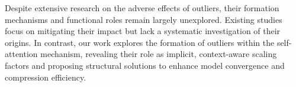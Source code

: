 Despite extensive research on the adverse effects of outliers, their formation mechanisms and functional roles remain largely unexplored. Existing studies focus on mitigating their impact but lack a systematic investigation of their origins. In contrast, our work explores the formation of outliers within the self-attention mechanism, revealing their role as implicit, context-aware scaling factors and proposing structural solutions to enhance model convergence and compression efficiency.

\vspace{-0.5mm}